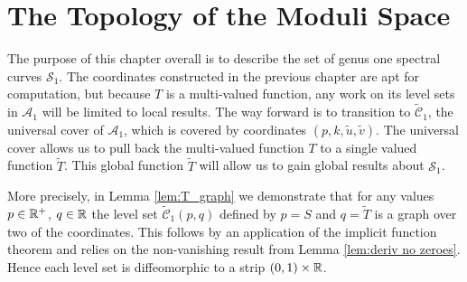 























\section{The Topology of the Moduli Space}
\label{sec:Topology}

The purpose of this chapter overall is to describe the set of genus one spectral curves $\mathcal{S}_1$. The coordinates constructed in the previous chapter are apt for computation, but because $T$ is a multi-valued function, any work on its level sets in $\mathcal{A}_1$ will be limited to local results. The way forward is to transition to $\mathcal{\tilde{C}}_1$, the universal cover of $\mathcal{A}_1$, which is covered by coordinates $(p,k,\tilde{u},\tilde{v})$. The universal cover allows us to pull back the multi-valued function $T$ to a single valued function $\tilde{T}$. This global function $\tilde{T}$ will allow us to gain global results about $\mathcal{S}_1$.

More precisely,
in Lemma \ref{lem:T_graph} we demonstrate that for any values $p \in \R^+$, $q\in\R$ the level set $\mathcal{\tilde{C}}_1(p,q)$ defined by $p = S$ and $q = \tilde{T}$ is a graph over two of the coordinates. This follows by an application of the implicit function theorem and relies on the non-vanishing result from Lemma \ref{lem:deriv no zeroes}. Hence each level set is diffeomorphic to a strip $(0,1)\times\R$.

